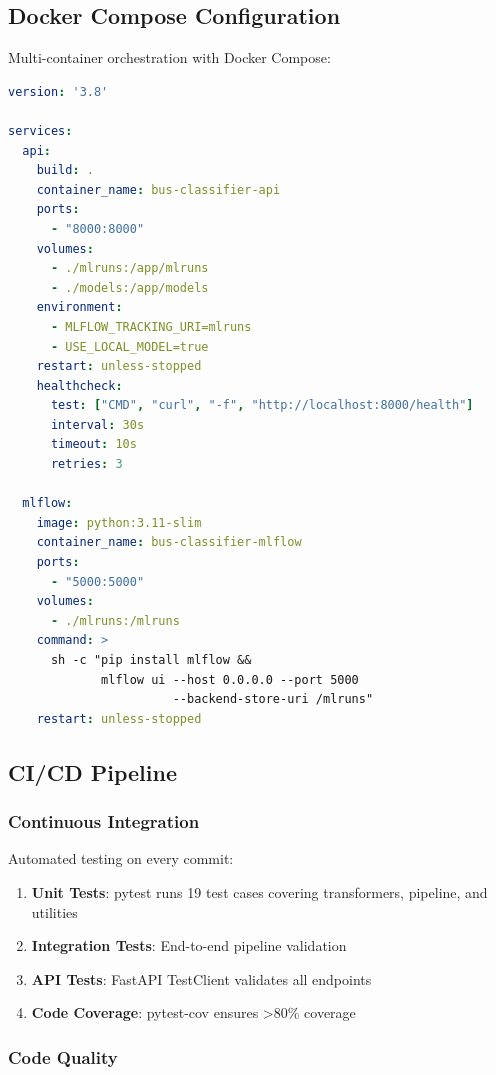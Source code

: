 \subsection{Docker Compose Configuration}

Multi-container orchestration with Docker Compose:

\begin{lstlisting}[language=yaml, caption=docker-compose.yml]
version: '3.8'

services:
  api:
    build: .
    container_name: bus-classifier-api
    ports:
      - "8000:8000"
    volumes:
      - ./mlruns:/app/mlruns
      - ./models:/app/models
    environment:
      - MLFLOW_TRACKING_URI=mlruns
      - USE_LOCAL_MODEL=true
    restart: unless-stopped
    healthcheck:
      test: ["CMD", "curl", "-f", "http://localhost:8000/health"]
      interval: 30s
      timeout: 10s
      retries: 3

  mlflow:
    image: python:3.11-slim
    container_name: bus-classifier-mlflow
    ports:
      - "5000:5000"
    volumes:
      - ./mlruns:/mlruns
    command: >
      sh -c "pip install mlflow &&
             mlflow ui --host 0.0.0.0 --port 5000 
                       --backend-store-uri /mlruns"
    restart: unless-stopped
\end{lstlisting}

\subsection{CI/CD Pipeline}

\subsubsection{Continuous Integration}

Automated testing on every commit:

\begin{enumerate}
    \item \textbf{Unit Tests}: pytest runs 19 test cases covering transformers, pipeline, and utilities
    \item \textbf{Integration Tests}: End-to-end pipeline validation
    \item \textbf{API Tests}: FastAPI TestClient validates all endpoints
    \item \textbf{Code Coverage}: pytest-cov ensures >80\% coverage
\end{enumerate}

\subsubsection{Code Quality}

